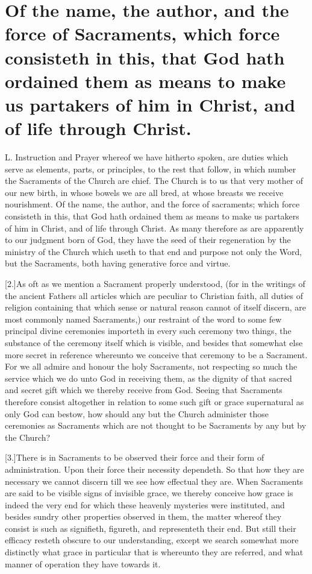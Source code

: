 \section*{Of the name, the author, and the force of Sacraments, which force consisteth in this, that God hath ordained them as means to make us partakers of him in Christ, and of life through Christ.}
L. Instruction and Prayer whereof we have hitherto spoken, are duties which serve as elements, parts, or principles, to the rest that follow, in which number the Sacraments of the Church are chief. The Church is to us that very mother of our new birth, in whose bowels we are all bred, at whose breasts we receive nourishment.
Of the name, the author, and the force of sacraments; which force consisteth in this, that God hath ordained them as means to make us partakers of him in Christ, and of life through Christ.
 As many therefore as are apparently to our judgment born of God, they have the seed of their regeneration by the ministry of the Church which useth to that end and purpose not only the Word, but the Sacraments, both having generative force and virtue.

[2.]As oft as we mention a Sacrament properly understood, (for in the writings of the ancient Fathers all articles which are peculiar to Christian faith, all duties of religion containing that which sense or natural reason cannot of itself discern, are most commonly named Sacraments,) our restraint of the word to some few principal divine ceremonies importeth in every such ceremony two things, the substance of the ceremony itself which is visible, and besides that somewhat else more secret in reference whereunto we conceive that ceremony to be a Sacrament. For we all admire and honour the holy Sacraments, not respecting so much the service which we do unto God in receiving them, as the dignity of that sacred and secret gift which we thereby receive from God. Seeing that Sacraments therefore consist altogether in relation to some such gift or grace supernatural as only God can bestow, how should any but the Church administer those ceremonies as Sacraments which are not thought to be Sacraments by any but by the Church?

[3.]There is in Sacraments to be observed their force and their form of administration. Upon their force their necessity dependeth. So that how they are necessary we cannot discern till we see how effectual they are. When Sacraments are said to be visible signs of invisible grace, we thereby conceive  how grace is indeed the very end for which these heavenly mysteries were instituted, and besides sundry other properties observed in them,
 the matter whereof they consist is such as signifieth, figureth, and representeth their end. But still their efficacy resteth obscure to our understanding, except we search somewhat more distinctly what grace in particular that is whereunto they are referred, and what manner of operation they have towards it.

